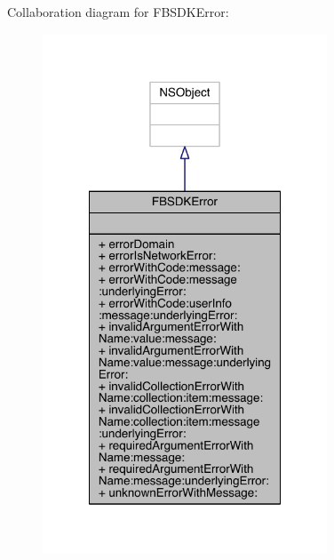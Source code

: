 Collaboration diagram for F\-B\-S\-D\-K\-Error\-:
\nopagebreak
\begin{figure}[H]
\begin{center}
\leavevmode
\includegraphics[width=240pt]{interface_f_b_s_d_k_error__coll__graph}
\end{center}
\end{figure}
